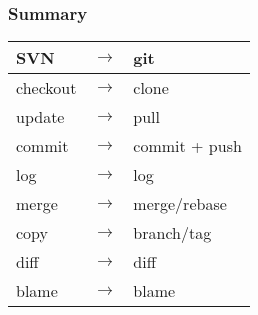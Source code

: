 \begin{frame}
	\frametitle{Summary}
	\begin{block}{}
		\begin{center}
			\begin{small}
				\begin{tabular}{|lcl|}
					\hline
					SVN & $\rightarrow$ & git \\
					\hline
					checkout & $\rightarrow$ & clone \\
					update & $\rightarrow$ & pull \\
					commit & $\rightarrow$ & commit + push \\
					log & $\rightarrow$ & log \\
					merge & $\rightarrow$ & merge/rebase \\
					copy & $\rightarrow$ & branch/tag \\
					diff & $\rightarrow$ & diff \\
					blame & $\rightarrow$ & blame \\
					\hline
				\end{tabular}
			\end{small}
		\end{center}
	\end{block}
\end{frame}
